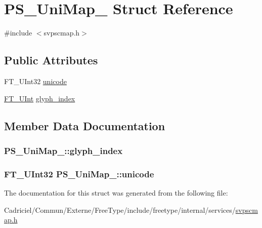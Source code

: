 \hypertarget{struct_p_s___uni_map__}{\section{P\-S\-\_\-\-Uni\-Map\-\_\- Struct Reference}
\label{struct_p_s___uni_map__}
}


{\ttfamily \#include $<$svpscmap.\-h$>$}

\subsection*{Public Attributes}
\begin{DoxyCompactItemize}
\item 
F\-T\-\_\-\-U\-Int32 \hyperlink{struct_p_s___uni_map___a87c1f471eb4033fc5ed9d0f1ecaf35a1}{unicode}
\item 
\hyperlink{fttypes_8h_abcb8db4dbf35d2b55a9e8c7b0926dc52}{F\-T\-\_\-\-U\-Int} \hyperlink{struct_p_s___uni_map___a0d5b2e3c405aeab1f1059a3587125cfd}{glyph\-\_\-index}
\end{DoxyCompactItemize}


\subsection{Member Data Documentation}
\hypertarget{struct_p_s___uni_map___a0d5b2e3c405aeab1f1059a3587125cfd}{
\subsubsection[{glyph\-\_\-index}]{ P\-S\-\_\-\-Uni\-Map\-\_\-\-::glyph\-\_\-index}}\label{struct_p_s___uni_map___a0d5b2e3c405aeab1f1059a3587125cfd}
\hypertarget{struct_p_s___uni_map___a87c1f471eb4033fc5ed9d0f1ecaf35a1}{
\subsubsection[{unicode}]{\setlength{\rightskip}{0pt plus 5cm}F\-T\-\_\-\-U\-Int32 P\-S\-\_\-\-Uni\-Map\-\_\-\-::unicode}}\label{struct_p_s___uni_map___a87c1f471eb4033fc5ed9d0f1ecaf35a1}


The documentation for this struct was generated from the following file\-:\begin{DoxyCompactItemize}
\item 
Cadriciel/\-Commun/\-Externe/\-Free\-Type/include/freetype/internal/services/\hyperlink{svpscmap_8h}{svpscmap.\-h}\end{DoxyCompactItemize}
